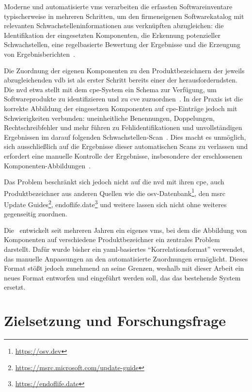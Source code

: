 Moderne und automatisierte \acrshort{vms} verarbeiten die erfassten Softwareinventare typischerweise in mehreren Schritten, um den firmeneigenen Softwarekatalog mit relevanten Schwachstelleninformationen aus verknüpften  abzugleichen:
die Identifikation der eingesetzten Komponenten, die Erkennung potenzieller Schwachstellen, eine regelbasierte Bewertung der Ergebnisse und die Erzeugung von Ergebnisberichten\ \autocite{Idrissi_Sebai_Faroukhi_Mahouachi_2024}.

Die Zuordnung der eigenen Komponenten zu den Produktbezeichnern der jeweils abzugleichenden \acrshort{vdb} ist als erster Schritt bereits einer der herausforderndsten.
Die \acrshort{nvd} etwa stellt mit dem \acrfull{cpe}-System ein Schema zur Verfügung, um Softwareprodukte zu identifizieren und zu \acrshort{cve} zuzuordnen\ \autocite{Cheikes_Waltermire_Scarfone_2011}.
In der Praxis ist die korrekte Abbildung der eingesetzen Komponenten auf \acrshort{cpe}-Einträge jedoch mit Schwierigkeiten verbunden:
uneinheitliche Benennungen, Doppelungen, Rechtschreibfehler und mehr führen zu Fehlidentifikationen und unvollständigen Ergebnissen im darauf folgenden Schwachstellen-Scan\ \autocite{Sanguino_Uetz_2017}.
Dies macht es unmöglich, sich ausschließlich auf die Ergebnisse dieser automatischen Scans zu verlassen und erfordert eine manuelle Kontrolle der Ergebnisse, insbesondere der erschlossenen Komponenten-Abbildungen\ \autocite{Sanguino_Uetz_2017}.

Das Problem beschränkt sich jedoch nicht auf die \acrshort{nvd} mit ihren \acrshort{cpe}, auch Produktbezeichner aus anderen Quellen wie die \acrfull{osv}-Datenbank\footnote{\url{https://osv.dev}}, den \acrfull{msrc} Update Guides\footnote{\url{https://msrc.microsoft.com/update-guide}}, endoflife.date\footnote{\url{https://endoflife.date}} und weitere lassen sich nicht ohne weiteres gegenseitig zuordnen.

Die \metaeffekt\ entwickelt seit mehreren Jahren ein eigenes \acrshort{vms}, bei dem die Abbildung von Komponenten auf verschiedene Produktbezeichner ein zentrales Problem darstellt.
Dafür wurde bisher ein \acrshort{yaml}-basiertes \enquote{Korrelationsformat} verwendet, das manuelle Anpassungen an den automatisierte Zuordnungen ermöglicht.
Dieses Format stößt jedoch zunehmend an seine Grenzen, weshalb mit dieser Arbeit ein neues Format entworfen und eingeführt werden soll, das das bestehende System ersetzt.


\section{Zielsetzung und Forschungsfrage}\label{sec:ziel-forschungsfrage}

